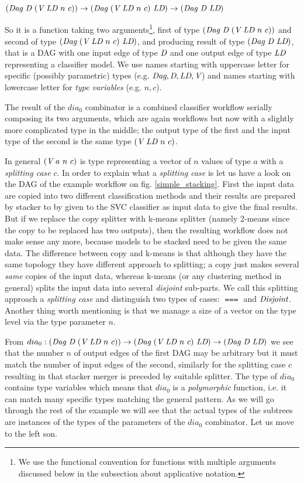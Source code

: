 \documentclass{ws-ijait}
\begin{document}
$(\textit{Dag}\ \textit{D}\ (\textit{V}\ \textit{LD}\ n\ c)) \rightarrow (\textit{Dag}\ (\textit{V}\ \textit{LD}\ n\ c)\ \textit{LD}) \rightarrow (\textit{Dag}\ \textit{D}\ \textit{LD})$
  
So it is a function taking two arguments\footnote{We use the functional convention for functions with multiple arguments discussed below in the subsection about applicative notation.}, 
first of type $(\textit{Dag}\ \textit{D}\ (\textit{V}\ \textit{LD}\ n\ c))$ and second of type $(\textit{Dag}\ (\textit{V}\ \textit{LD}\ n\ c)\ \textit{LD})$, 
and producing result of type $(\textit{Dag}\ \textit{D}\ \textit{LD})$, that is a DAG with one input edge of type $\textit{D}$ and one output edge of type $\textit{LD}$ representing a classifier model.
We use names starting with uppercase letter for specific (possibly parametric) types (e.g. $\textit{Dag}, \textit{D}, \textit{LD}, \textit{V}$) 
and names starting with lowercase letter for \textit{type variables} (e.g. $n, c$).

The result of the $dia_0$ combinator is a combined classifier workflow serially composing its two arguments, which are again workflows but now with a slightly more complicated type in the middle; 
the output type of the first and the input type of the second is the same type $(\textit{V}\ \textit{LD}\ n\ c)$. 

In general $(\textit{V}\ a\ n\ c)$ is type representing a vector of $n$ values of type $a$ 
with a \textit{splitting case} $c$.
In order to explain what a \textit{splitting case} is let us have a look on the DAG of the example workflow on fig. \ref{simple_stacking}. First the input data are copied into two different classification methods and their results are prepared by stacker to by given to the SVC classifier as input data to give the final results. But if we replace the copy splitter with k-means splitter (namely 2-means since the copy to be replaced has two outputs), then the resulting workflow does not make sense any more, because models to be stacked need to be given the same data. The difference between copy and k-means is that although they have the same topology they have different approach to splitting; a copy just makes several \textit{same} copies of the input data, whereas k-means (or any clustering method in general) splits the input data into several \textit{disjoint} sub-parts. We call this splitting approach a \textit{splitting case} and distinguish two types of cases: $\Same$ and $\textit{Disjoint}$. Another thing worth mentioning is that we manage a size of a vector on the type level via the type parameter $n$.

From $dia_0 : (\textit{Dag}\ \textit{D}\ (\textit{V}\ \textit{LD}\ n\ c)) \rightarrow (\textit{Dag}\ (\textit{V}\ \textit{LD}\ n\ c)\ \textit{LD}) \rightarrow (\textit{Dag}\ \textit{D}\ \textit{LD})$ we see that
the number $n$ of output edges of the first DAG may be arbitrary but it must match the number of input edges of the second, similarly for the splitting case $c$ resulting in that stacker merger is preceded by suitable splitter. The type of $dia_0$ contains type variables which means that $dia_0$ is a \textit{polymorphic} function, i.e. it can match many specific types matching the general pattern. 
As we will go through the rest of the example we will see that the actual types of the subtrees are  instances of the types of the parameters of the $dia_0$ combinator. Let us move to the left son.
\end{document}
